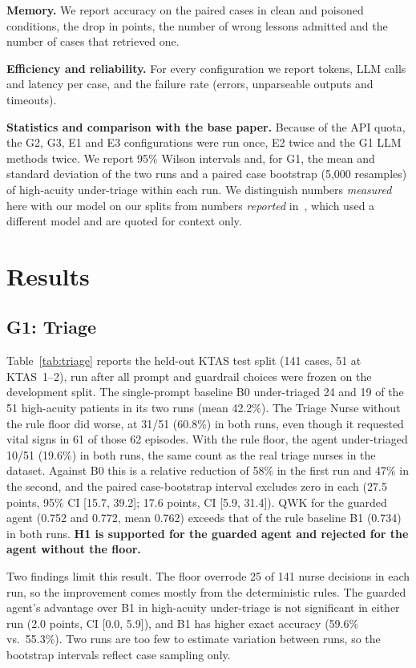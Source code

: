 \documentclass[conference]{IEEEtran}
\begin{document}
\textbf{Memory.} We report accuracy on the paired cases in clean and poisoned conditions, the drop
in points, the number of wrong lessons admitted and the number of cases that retrieved one.

\textbf{Efficiency and reliability.} For every configuration we report tokens, LLM calls and
latency per case, and the failure rate (errors, unparseable outputs and timeouts).

\textbf{Statistics and comparison with the base paper.} Because of the API quota, the
G2, G3, E1 and E3 configurations were run once, E2 twice and the G1 LLM methods twice. We report 95\% Wilson intervals
and, for G1, the mean and standard deviation of the two runs and a paired case bootstrap (5,000
resamples) of high-acuity under-triage within each run. We distinguish numbers \emph{measured} here with our
model on our splits from numbers \emph{reported} in~\cite{almansoori2025medagentsim}, which used a
different model and are quoted for context only.

\section{Results}

\subsection{G1: Triage}

Table~\ref{tab:triage} reports the held-out KTAS test split (141 cases, 51 at KTAS~1--2), run
after all prompt and guardrail choices were frozen on the development split. The single-prompt
baseline B0 under-triaged 24 and 19 of the 51 high-acuity patients in its two runs (mean 42.2\%).
The Triage Nurse without the rule floor did worse, at 31/51 (60.8\%) in both runs, even though it
requested vital signs in 61 of those 62 episodes. With the rule floor, the agent under-triaged 10/51
(19.6\%) in both runs, the same count as the real triage nurses in the dataset. Against B0 this is a
relative reduction of 58\% in the first run and 47\% in the second, and the paired case-bootstrap
interval excludes zero in each (27.5 points, 95\% CI [15.7, 39.2]; 17.6 points, CI [5.9, 31.4]). QWK
for the guarded agent (0.752 and 0.772, mean 0.762) exceeds that of the rule baseline B1 (0.734) in
both runs. \textbf{H1 is supported for the guarded agent and rejected for the agent without the
floor.}

Two findings limit this result. The floor overrode 25 of 141 nurse decisions in each run, so the
improvement comes mostly from the deterministic rules. The guarded agent's advantage over B1 in
high-acuity under-triage is not significant in either run (2.0 points, CI [0.0, 5.9]), and B1 has
higher exact accuracy (59.6\% vs.\ 55.3\%). Two runs are too few to estimate variation between runs,
so the bootstrap intervals reflect case sampling only.
\end{document}
